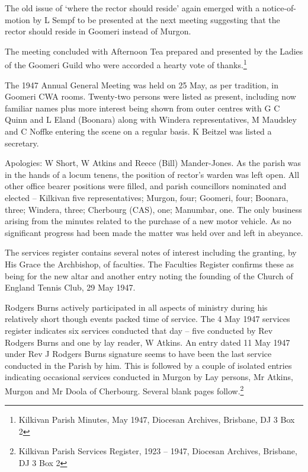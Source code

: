 The old issue of `where the rector should reside' again emerged with a notice-of-motion by L Sempf to be presented at the next meeting suggesting that the rector should reside in Goomeri instead of Murgon.

The meeting concluded with Afternoon Tea prepared and presented by the Ladies of the Goomeri Guild who were accorded a hearty vote of thanks.\footnote{Kilkivan Parish Minutes, May 1947, Diocesan Archives, Brisbane, DJ 3 Box 2}

The 1947 Annual General Meeting was held on 25 May, as per tradition, in Goomeri CWA rooms. Twenty-two persons were listed as present, including now familiar names plus more interest being shown from outer centres with G C Quinn and L Eland (Boonara) along with Windera representatives, M Maudsley and C Noffke entering the scene on a regular basis. K Beitzel was listed a secretary.

Apologies: W Short, W Atkins and Reece (Bill) Mander-Jones. As the parish was in the hands of a locum tenens, the position of rector's warden was left open. All other office bearer positions were filled, and parish councillors nominated and elected -- Kilkivan five representatives; Murgon, four; Goomeri, four; Boonara, three; Windera, three; Cherbourg (CAS), one; Manumbar, one. The only business arising from the minutes related to the purchase of a new motor vehicle. As no significant progress had been made the matter was held over and left in abeyance.

The services register contains several notes of interest including the granting, by His Grace the Archbishop, of faculties. The Faculties Register confirms these as being for the new altar and another entry noting the founding of the Church of England Tennis Club, 29 May 1947.

Rodgers Burns actively participated in all aspects of ministry during his relatively short though events packed time of service. The 4 May 1947 services register indicates six services conducted that day -- five conducted by Rev Rodgers Burns and one by lay reader, W Atkins. An entry dated 11 May 1947 under Rev J Rodgers Burns signature seems to have been the last service conducted in the Parish by him. This is followed by a couple of isolated entries indicating occasional services conducted in Murgon by Lay persons, Mr Atkins, Murgon and Mr Doola of Cherbourg. Several blank pages follow.\footnote{Kilkivan Parish Services Register, 1923 -- 1947, Diocesan Archives, Brisbane, DJ 3 Box 2}

